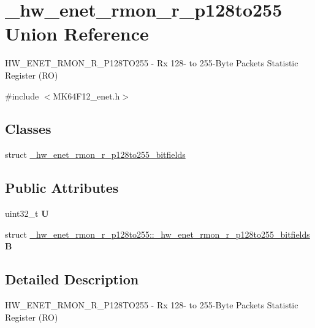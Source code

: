 \hypertarget{union__hw__enet__rmon__r__p128to255}{}\section{\+\_\+hw\+\_\+enet\+\_\+rmon\+\_\+r\+\_\+p128to255 Union Reference}
\label{union__hw__enet__rmon__r__p128to255}


H\+W\+\_\+\+E\+N\+E\+T\+\_\+\+R\+M\+O\+N\+\_\+\+R\+\_\+\+P128\+T\+O255 -\/ Rx 128-\/ to 255-\/\+Byte Packets Statistic Register (RO)  




{\ttfamily \#include $<$M\+K64\+F12\+\_\+enet.\+h$>$}

\subsection*{Classes}
\begin{DoxyCompactItemize}
\item 
struct \hyperlink{struct__hw__enet__rmon__r__p128to255_1_1__hw__enet__rmon__r__p128to255__bitfields}{\+\_\+hw\+\_\+enet\+\_\+rmon\+\_\+r\+\_\+p128to255\+\_\+bitfields}
\end{DoxyCompactItemize}
\subsection*{Public Attributes}
\begin{DoxyCompactItemize}
\item 
uint32\+\_\+t {\bfseries U}\hypertarget{union__hw__enet__rmon__r__p128to255_a1c76143750835ccc7ee3b9a85821bf89}{}\label{union__hw__enet__rmon__r__p128to255_a1c76143750835ccc7ee3b9a85821bf89}

\item 
struct \hyperlink{struct__hw__enet__rmon__r__p128to255_1_1__hw__enet__rmon__r__p128to255__bitfields}{\+\_\+hw\+\_\+enet\+\_\+rmon\+\_\+r\+\_\+p128to255\+::\+\_\+hw\+\_\+enet\+\_\+rmon\+\_\+r\+\_\+p128to255\+\_\+bitfields} {\bfseries B}\hypertarget{union__hw__enet__rmon__r__p128to255_afbec8d39aa1efda6d30e3025bab74ef7}{}\label{union__hw__enet__rmon__r__p128to255_afbec8d39aa1efda6d30e3025bab74ef7}

\end{DoxyCompactItemize}


\subsection{Detailed Description}
H\+W\+\_\+\+E\+N\+E\+T\+\_\+\+R\+M\+O\+N\+\_\+\+R\+\_\+\+P128\+T\+O255 -\/ Rx 128-\/ to 255-\/\+Byte Packets Statistic Register (RO) 

